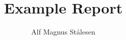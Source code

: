 \documentclass[]{report}
\title{Example Report}
\author{Alf Magnus Stålesen}
\begin{document}
\maketitle

\begin{abstract}
\end{abstract}



\end{document}
